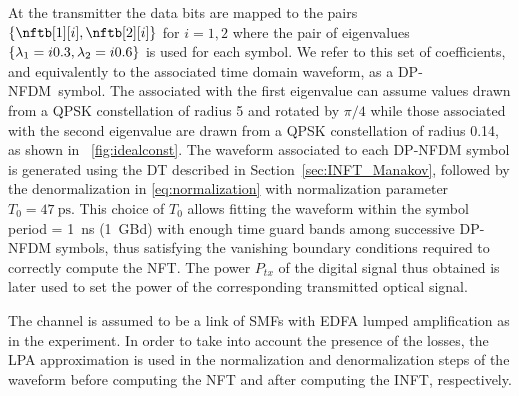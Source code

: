 At the transmitter the data bits are mapped to the \scatcoef{} pairs $\{\nftb[1][i],\nftb[2][i]\}$ for $i=1,2$ where the pair of eigenvalues $\{\eig[1] = \iunit0.3,\eig[2] = \iunit0.6\}$ is used for each symbol. We  refer to this set of coefficients, and equivalently to the associated time domain waveform, as a \ac{DP-NFDM}~symbol. The \scatcoef{} associated with the first eigenvalue can assume values drawn from a \ac{QPSK} constellation of radius 5 and rotated by $\pi/4$ while those associated with the second eigenvalue are drawn from a \ac{QPSK} constellation of radius 0.14, as shown in \figurename~\ref{fig:idealconst}.
The waveform associated to each \ac{DP-NFDM} symbol is generated using the \ac{DT} described in Section~\ref{sec:INFT_Manakov}, followed by the denormalization in \eqref{eq:normalization}  with normalization parameter
$T_0 = \SI{47}{\ps}$. This choice of $T_0$ allows fitting the waveform within the symbol period \Ts{} = \SI{1}{\ns} (\SI{1}{GBd}) with enough time guard bands among successive
\ac{DP-NFDM} symbols, thus satisfying the vanishing boundary conditions required to
correctly compute the \ac{NFT}. The power $P_{tx}$ of the digital signal thus
obtained is later used to set the power of the corresponding transmitted
optical signal.

The channel is assumed to be a link of \acp{SMF} with \ac{EDFA}
lumped amplification as in the experiment. In order to take into account the presence of the
losses, the \ac{LPA} approximation is used in the normalization and
denormalization steps of the waveform before computing the \ac{NFT} and after
computing the \ac{INFT}, respectively.

